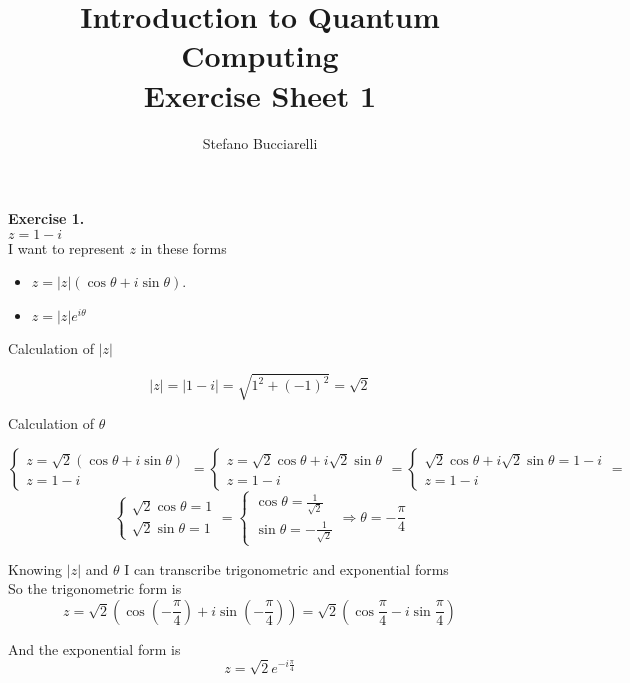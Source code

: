 \documentclass{article}
\title{
Introduction to Quantum Computing \\  Exercise Sheet 1}
\author{Stefano Bucciarelli}
\begin{document}
\maketitle

\textbf{Exercise 1.} \\

\(z = 1 - i\) \\

I want to represent \(z\) in these forms
\begin{itemize}
    \item \(z = |z|(\cos \theta + i \sin \theta)\).
    \item \(z = |z|e^{i\theta}\)
\end{itemize} 

Calculation of \(|z|\)

\[|z| = | 1 - i | = \sqrt{1^2 + \left(-1\right)^2} = \sqrt{2} \]

Calculation of \(\theta\)

\[ 
\begin{cases} z=\sqrt{2}\left(\cos \theta + i \sin \theta\right) \\ z = 1 - i \end{cases} = 
\begin{cases} z=\sqrt{2}\cos\theta + i\sqrt{2} \sin \theta \\ z = 1 - i \end{cases} = 
\begin{cases} \sqrt{2}\cos\theta + i\sqrt{2} \sin \theta = 1 - i \\ z = 1 - i \end{cases} = \]
\[
\begin{cases} \sqrt{2}\cos\theta = 1 \\ \sqrt{2} \sin \theta = 1 \end{cases} = 
\begin{cases} \cos\theta = \frac{1}{\sqrt{2}} \\ \sin \theta = -\frac{1}{\sqrt{2}}\end{cases}  \Rightarrow
\theta = - \frac{\pi}{4}
\]

Knowing \(|z|\) and \(\theta\) I can transcribe trigonometric and exponential forms \\

So the trigonometric form is
\[z = \sqrt{2}(\cos (- \frac{\pi}{4}) + i \sin (- \frac{\pi}{4})) = \sqrt{2}(\cos  \frac{\pi}{4} - i \sin \frac{\pi}{4}) \]

And the exponential form is
\[z = \sqrt{2}e^{-i \frac{\pi}{4}}\] \\
\end{document}
